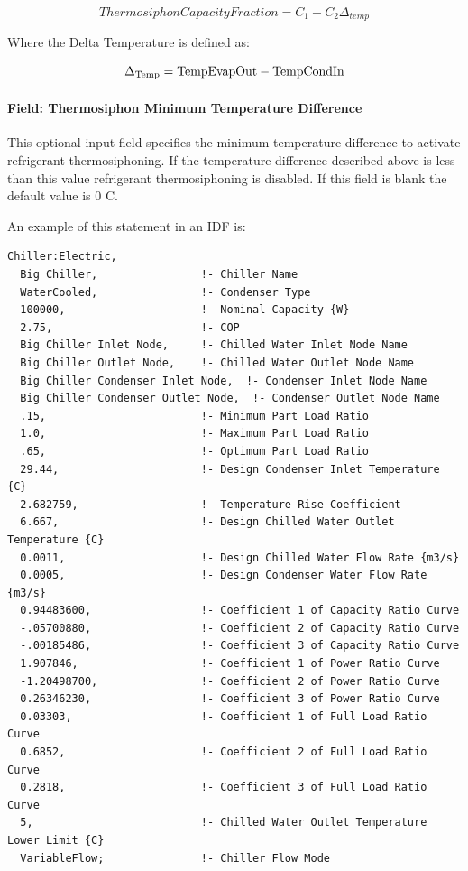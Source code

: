 \begin{equation}
    ThermosiphonCapacityFraction = {C_1} + {C_2}{\Delta_{temp}}
\end{equation}

Where the Delta Temperature is defined as:

\begin{equation}
{\Delta_{{\rm{Temp}}}}
    = {\rm{TempEvapOut  -  TempCondIn }}
\end{equation}

\paragraph{Field: Thermosiphon Minimum Temperature Difference}\label{thermosiphon-minimum-temperature-difference2}

This optional input field specifies the minimum temperature difference to activate refrigerant thermosiphoning. If the temperature difference described above is less than this value refrigerant thermosiphoning is disabled. If this field is blank the default value is 0 C.


An example of this statement in an IDF is:

\begin{lstlisting}
Chiller:Electric,
  Big Chiller,                !- Chiller Name
  WaterCooled,                !- Condenser Type
  100000,                     !- Nominal Capacity {W}
  2.75,                       !- COP
  Big Chiller Inlet Node,     !- Chilled Water Inlet Node Name
  Big Chiller Outlet Node,    !- Chilled Water Outlet Node Name
  Big Chiller Condenser Inlet Node,  !- Condenser Inlet Node Name
  Big Chiller Condenser Outlet Node,  !- Condenser Outlet Node Name
  .15,                        !- Minimum Part Load Ratio
  1.0,                        !- Maximum Part Load Ratio
  .65,                        !- Optimum Part Load Ratio
  29.44,                      !- Design Condenser Inlet Temperature {C}
  2.682759,                   !- Temperature Rise Coefficient
  6.667,                      !- Design Chilled Water Outlet Temperature {C}
  0.0011,                     !- Design Chilled Water Flow Rate {m3/s}
  0.0005,                     !- Design Condenser Water Flow Rate {m3/s}
  0.94483600,                 !- Coefficient 1 of Capacity Ratio Curve
  -.05700880,                 !- Coefficient 2 of Capacity Ratio Curve
  -.00185486,                 !- Coefficient 3 of Capacity Ratio Curve
  1.907846,                   !- Coefficient 1 of Power Ratio Curve
  -1.20498700,                !- Coefficient 2 of Power Ratio Curve
  0.26346230,                 !- Coefficient 3 of Power Ratio Curve
  0.03303,                    !- Coefficient 1 of Full Load Ratio Curve
  0.6852,                     !- Coefficient 2 of Full Load Ratio Curve
  0.2818,                     !- Coefficient 3 of Full Load Ratio Curve
  5,                          !- Chilled Water Outlet Temperature Lower Limit {C}
  VariableFlow;               !- Chiller Flow Mode
\end{lstlisting}

